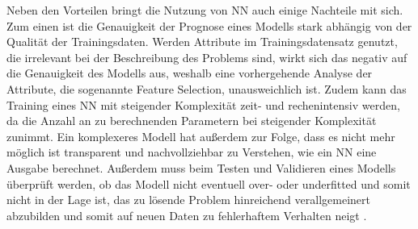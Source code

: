 Neben den Vorteilen bringt die Nutzung von \ac{NN} auch einige Nachteile mit sich. Zum einen ist die Genauigkeit der Prognose eines Modells stark abhängig von der Qualität der Trainingsdaten.
Werden Attribute im Trainingsdatensatz genutzt, die irrelevant bei der Beschreibung des Problems sind, wirkt sich das negativ auf die Genauigkeit des Modells aus, weshalb eine
vorhergehende Analyse der Attribute, die sogenannte \glqq Feature Selection\grqq{}, unausweichlich ist. Zudem kann das Training eines \ac{NN} mit steigender Komplexität
zeit- und rechenintensiv werden, da die Anzahl an zu berechnenden Parametern bei steigender Komplexität zunimmt. Ein komplexeres Modell hat außerdem zur Folge, dass es nicht mehr 
möglich ist transparent und nachvollziehbar zu Verstehen, wie ein \ac{NN} eine Ausgabe berechnet. Außerdem muss beim Testen und Validieren eines Modells überprüft werden, 
ob das Modell nicht eventuell over- oder underfitted und somit nicht in der Lage ist, das zu lösende Problem hinreichend verallgemeinert abzubilden und somit auf neuen Daten
zu fehlerhaftem Verhalten neigt \cite[vgl. S.84ff.]{NN}.





